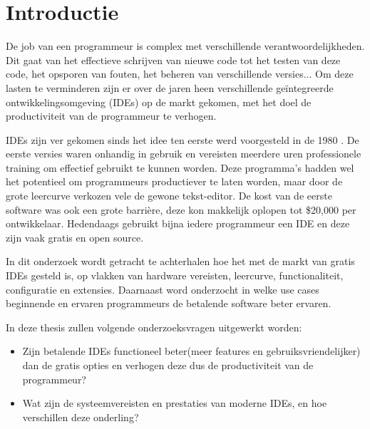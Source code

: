 
\section{Introductie} %
\label{sec:introductie}

De job van een programmeur is complex met verschillende verantwoordelijkheden. Dit gaat van het effectieve schrijven van nieuwe code tot het testen van deze code, het opsporen van fouten, het beheren van verschillende versies... Om deze lasten te verminderen zijn er over de jaren heen verschillende geïntegreerde ontwikkelingsomgeving (IDEs) op de markt gekomen, met het doel de productiviteit van de programmeur te verhogen. 

IDEs zijn ver gekomen sinds het idee ten eerste werd voorgesteld in de 1980 \autocite{Kline2005}. De eerste versies waren onhandig in gebruik en vereisten meerdere uren professionele training om effectief gebruikt te kunnen worden. Deze programma’s hadden wel het potentieel om programmeurs productiever te laten worden, maar door de grote leercurve verkozen vele de gewone tekst-editor. De kost van de eerste software was ook een grote barrière, deze kon makkelijk oplopen tot \$20,000 per ontwikkelaar. Hedendaags gebruikt bijna iedere programmeur een IDE en deze zijn vaak gratis en open source. 

In dit onderzoek wordt getracht te achterhalen hoe het met de markt van gratis IDEs gesteld is, op vlakken van hardware vereisten, leercurve, functionaliteit, configuratie en extensies. Daarnaast word onderzocht in welke use cases beginnende en ervaren programmeurs de betalende software beter ervaren.

In deze thesis zullen volgende onderzoeksvragen uitgewerkt worden:

\begin{itemize}
    \item Zijn betalende IDEs functioneel beter(meer features en gebruiksvriendelijker) dan de gratis opties en verhogen deze dus de productiviteit van de programmeur?
    \item Wat zijn de systeemvereisten en prestaties van moderne IDEs, en hoe verschillen deze onderling?
\end{itemize}


